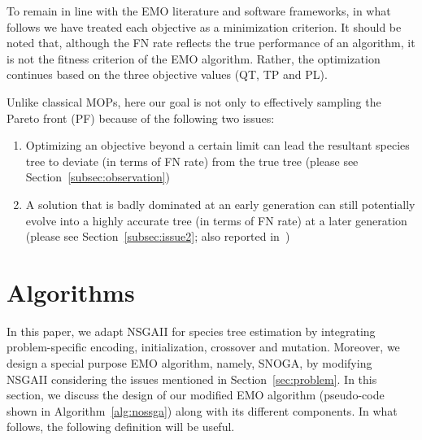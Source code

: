 To remain in line with the EMO literature and software frameworks, in what follows we have treated each objective as a minimization criterion. It should be noted that, although the FN rate reflects the true performance of an algorithm, it is not the fitness criterion of the EMO algorithm. Rather, the optimization continues based on the three objective values (QT, TP and PL).

Unlike classical MOPs, here our goal is not only to effectively sampling the Pareto front (PF) because of the following two issues:
\begin{enumerate}[label=$I_\arabic*$]
	\item \label{item:i1} Optimizing an objective beyond a certain limit can lead the resultant species tree to deviate (in terms of FN rate) from the true tree (please see Section~\ref{subsec:observation})
\item \label{item:i2} A solution that is badly dominated at an early generation can still potentially evolve into a highly accurate tree (in terms of FN rate) at a later generation (please see Section~\ref{subsec:issue2}; also reported in~\cite{qu2010multi})
\end{enumerate}



%
 \section{Algorithms}
\label{sec:method}
In this paper, we adapt NSGAII for species tree estimation by integrating problem-specific encoding, initialization, crossover and mutation. Moreover, we design a special purpose EMO algorithm, namely, SNOGA, by modifying NSGAII considering the issues mentioned in Section~\ref{sec:problem}. In this section, we discuss the design of our modified EMO algorithm (pseudo-code shown in Algorithm~\ref{alg:nossga}) along with its different components. In what follows, the following definition will be useful. 

